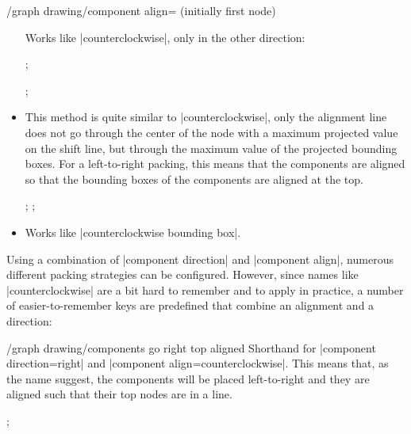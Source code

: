\begin{key}{/graph drawing/component align= (initially first node)}
\begin{itemize}
    Works like |counterclockwise|, only in the other direction:
\begin{codeexample}[]
\tikz {};
\end{codeexample}
\begin{codeexample}[]
\tikz {};
\end{codeexample}
  \item {}

    This method is quite similar to |counterclockwise|, only the
    alignment line does not go through the center of the node with a
    maximum projected value on the shift line, but through the maximum
    value of the projected bounding boxes. For a left-to-right
    packing, this means that the components are aligned so that the
    bounding boxes of the components are aligned at the top.
\begin{codeexample}[]
\tikz {};\quad
\tikz {};
\end{codeexample}
  \item {}
    
    Works like |counterclockwise bounding box|.
  \end{itemize}
\end{key}

Using a combination of |component direction| and |component align|,
numerous different packing strategies can be configured. However,
since names like |counterclockwise| are a bit hard to remember and to
apply in practice, a number of easier-to-remember keys are predefined
that combine an alignment and a direction:

\begin{key}{/graph drawing/components go right top aligned}
  Shorthand for |component direction=right| and
  |component align=counterclockwise|. This means that, as the name
  suggest, the components will be placed left-to-right and they are
  aligned such that their top nodes are in a line.  
\begin{codeexample}[]  
\tikz {};
\end{codeexample}
\end{key}

